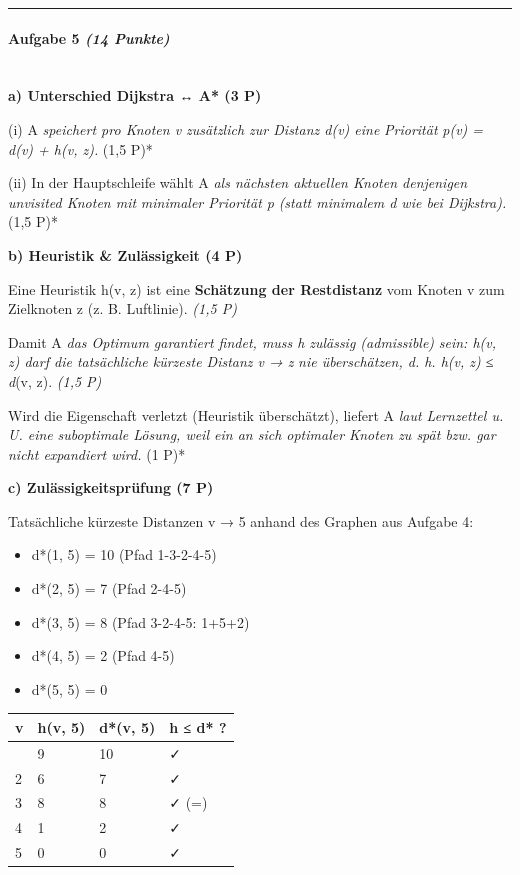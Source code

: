 \documentclass[11pt, a4paper]{article}
\begin{document}
\noindent\textcolor{rulegray}{\rule{\linewidth}{0.4pt}}


\paragraph{Aufgabe 5 \textit{(14 Punkte)}}\mbox{}\\[2pt]

\textbf{a) Unterschied Dijkstra ↔ A* (3 P)}


(i) A\textit{ speichert pro Knoten v zusätzlich zur Distanz d(v) eine }\textit{Priorität}\textit{ p(v) = d(v) + h(v, z). }(1,5 P)*

(ii) In der Hauptschleife wählt A\textit{ als nächsten aktuellen Knoten denjenigen unvisited Knoten mit }\textit{minimaler Priorität p}\textit{ (statt minimalem d wie bei Dijkstra). }(1,5 P)*


\textbf{b) Heuristik \& Zulässigkeit (4 P)}


Eine Heuristik h(v, z) ist eine \textbf{Schätzung der Restdistanz} vom Knoten v zum Zielknoten z (z. B. Luftlinie). \textit{(1,5 P)}


Damit A\textit{ das Optimum garantiert findet, muss h }\textit{zulässig (admissible)}\textit{ sein: h(v, z) darf die tatsächliche kürzeste Distanz v → z }\textit{nie überschätzen}\textit{, d. h. h(v, z) ≤ d}(v, z). \textit{(1,5 P)}


Wird die Eigenschaft verletzt (Heuristik überschätzt), liefert A\textit{ laut Lernzettel u. U. eine }\textit{suboptimale Lösung}\textit{, weil ein an sich optimaler Knoten zu spät bzw. gar nicht expandiert wird. }(1 P)*


\textbf{c) Zulässigkeitsprüfung (7 P)}


Tatsächliche kürzeste Distanzen v → 5 anhand des Graphen aus Aufgabe 4:

\begin{itemize}
  \item d*(1, 5) = 10 (Pfad 1-3-2-4-5)
  \item d*(2, 5) = 7 (Pfad 2-4-5)
  \item d*(3, 5) = 8 (Pfad 3-2-4-5: 1+5+2)
  \item d*(4, 5) = 2 (Pfad 4-5)
  \item d*(5, 5) = 0
\end{itemize}


{\small
\begin{tabularx}{\linewidth}{XXXX}
\hline
\rowcolor{tableheadbg}
{\color{white}\textbf{v}} & {\color{white}\textbf{h(v, 5)}} & {\color{white}\textbf{d*(v, 5)}} & {\color{white}\textbf{h ≤ d* ?}} \\[2pt]
\hline
\endhead
\hline
\endfoot
1 & 9 & 10 & ✓ \\
2 & 6 & 7 & ✓ \\
3 & 8 & 8 & ✓ (=) \\
4 & 1 & 2 & ✓ \\
5 & 0 & 0 & ✓ \\
\end{tabularx}
}
\end{document}

